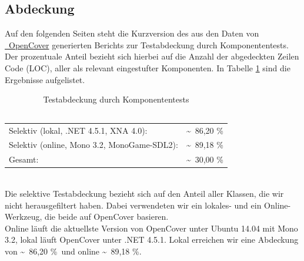%



\subsection{Abdeckung}
\label{Abschnitt:Tests:Statistik:Abdeckung}

\newcommand\VSLocalCoverage{\textasciitilde~86,20 \%}

\newcommand\OnlineLocalCoverage{\textasciitilde~89,18 \%}

\newcommand\VSGlobalCoverage{\textasciitilde~30,00 \%}

Auf den folgenden Seiten steht die Kurzversion des aus den Daten von \hyperref[Abschnitt:Tests:Werkzeuge:Automatisiert:OpenCover]{\mousecursor~OpenCover} generierten Berichts zur Testabdeckung durch Komponententests.
Der prozentuale Anteil bezieht sich hierbei auf die Anzahl der abgedeckten Zeilen Code (LOC), aller als relevant eingestufter Komponenten. In Tabelle \ref{Abschnitt:Tests:Statistik:Abdeckung:Tabelle} sind die Ergebnisse aufgelistet.

\begin{longtable}{p{0.75\hsize}p{0.25\hsize}}

	\caption{Testabdeckung durch Komponententests\\~\\}
	\label{Abschnitt:Tests:Statistik:Abdeckung:Tabelle}
	\\

	  Selektiv (lokal, .NET 4.5.1, XNA 4.0):
	& \VSLocalCoverage \\
	
	  Selektiv (online, Mono 3.2, MonoGame-SDL2):
	& \OnlineLocalCoverage \\
	
	  Gesamt:
	& \VSGlobalCoverage \\

\end{longtable}

~\\

Die selektive Testabdeckung bezieht sich auf den Anteil aller Klassen, die wir nicht herausgefiltert haben.
Dabei verwendeten wir ein lokales- und ein Online-Werkzeug, die beide auf OpenCover basieren.
~\\

Online läuft die aktuellste Version von OpenCover unter Ubuntu 14.04 mit Mono 3.2, lokal läuft OpenCover unter .NET 4.5.1.
Lokal erreichen wir eine Abdeckung von \VSLocalCoverage~und online \OnlineLocalCoverage.
~\\

